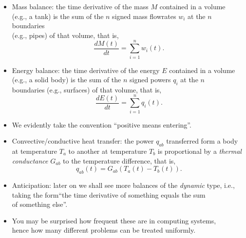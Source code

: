 \begin{frame}
\myPause
\begin{itemize}[<+-| alert@+>]
\item Mass balance: the time derivative of the mass $M$ contained in a volume\\
      (e.g., a tank) is the sum of the $n$ signed mass flowrates $w_i$ at the $n$ boundaries\\
      (e.g., pipes) of that volume, that is,
      \begin{displaymath}
       \frac{dM(t)}{dt} = \sum_{i=1}^n w_i(t).
      \end{displaymath}
\item Energy balance: the time derivative of the energy $E$ contained in a volume\\
      (e.g., a solid body) is the sum of the $n$ signed powers $q_i$ at the $n$\\
      boundaries (e.g., surfaces) of that volume, that is,
      \begin{displaymath}
       \frac{dE(t)}{dt} = \sum_{i=1}^n q_i(t).
      \end{displaymath}
\item We evidently take the convention ``positive means entering''.
\end{itemize}
\end{frame}

\begin{frame}
\myPause
\begin{itemize}[<+-| alert@+>]
\item Convective/conductive heat transfer: the power $q_{ab}$ transferred form a body at temperature $T_a$
      to another at temperature $T_b$ is proportional by a \emph{thermal conductance} $G_{ab}$ to the temperature
      difference, that is,
      \begin{displaymath}
       q_{ab}(t) = G_{ab} \left( T_a(t)-T_b(t) \right).
      \end{displaymath}
\item Anticipation: later on we shall see more balances of the \emph{dynamic} type, i.e.,\\
      taking the form``the time derivative of something equals the sum\\
      of something else''.
\item You may be surprised how frequent these are in computing systems,\\
      hence how many different problems can be treated uniformly.
\end{itemize}
\end{frame}

